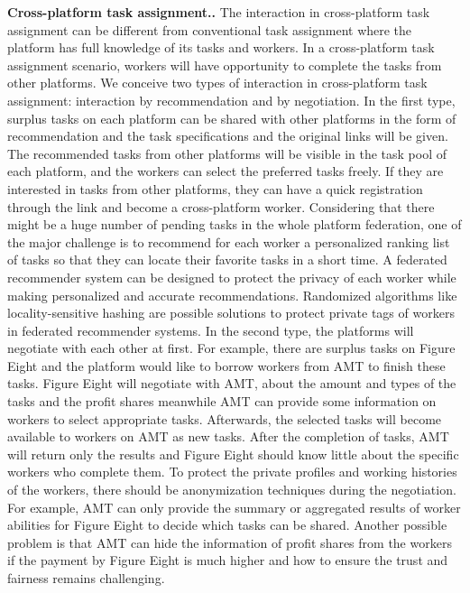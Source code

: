 \documentclass[11pt]{article}
\newcommand{\fakeparagraph}[1]{\vspace{1mm}\noindent\textbf{#1.}}
\begin{document}
\fakeparagraph{Cross-platform task assignment.}
The interaction in cross-platform task assignment can be different from conventional task assignment where the platform has full knowledge of its tasks and workers.
In a cross-platform task assignment scenario, workers will have opportunity to complete the tasks from other platforms.
We conceive two types of interaction in cross-platform task assignment: interaction by recommendation and by negotiation.
In the first type, surplus tasks on each platform can be shared with other platforms in the form of recommendation and the task specifications and the original links will be given.
The recommended tasks from other platforms will be visible in the task pool of each platform, and the workers can select the preferred tasks freely.
If they are interested in tasks from other platforms, they can have a quick registration through the link and become a cross-platform worker.
Considering that there might be a huge number of pending tasks in the whole platform federation, one of the major challenge is to recommend for each worker a personalized ranking list of tasks so that they can locate their favorite tasks in a short time.
A federated recommender system can be designed to protect the privacy of each worker while making personalized and accurate recommendations.
Randomized algorithms like locality-sensitive hashing are possible solutions to protect private tags of workers in federated recommender systems. 
In the second type, the platforms will negotiate with each other at first.
For example, there are surplus tasks on Figure Eight and the platform would like to borrow workers from AMT to finish these tasks. 
Figure Eight will negotiate with AMT, about the amount and types of the tasks and the profit shares meanwhile AMT can provide some information on workers to select appropriate tasks.
Afterwards, the selected tasks will become available to workers on AMT as new tasks.
After the completion of tasks, AMT will return only the results and Figure Eight should know little about the specific workers who complete them.
To protect the private profiles and working histories of the workers, there should be anonymization techniques during the negotiation.
For example, AMT can only provide the summary or aggregated results of worker abilities for Figure Eight to decide which tasks can be shared.
Another possible problem is that AMT can hide the information of profit shares from the workers if the payment by Figure Eight is much higher and how to ensure the trust and fairness remains challenging. 
\end{document}
